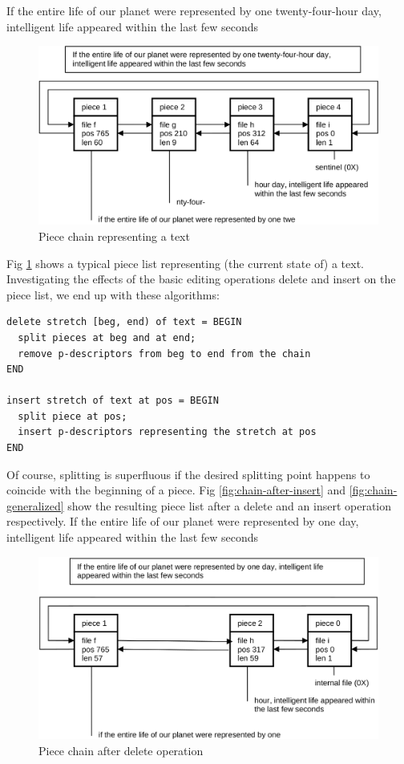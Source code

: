 If the entire life of our planet were represented by one twenty-four-hour day,
intelligent life appeared within the last few seconds
\begin{figure}
	\label{fig:chain}
	\centering
	\includegraphics[width=\textwidth]{i/d}
	\caption{Piece chain representing a text}
\end{figure}

Fig \ref{fig:chain} shows a typical piece list representing (the current state of) a text. Investigating the
effects of the basic editing operations delete and insert on the piece list, we end up with these
algorithms:
\begin{verbatim}
delete stretch [beg, end) of text = BEGIN
  split pieces at beg and at end;
  remove p-descriptors from beg to end from the chain
END

insert stretch of text at pos = BEGIN
  split piece at pos;
  insert p-descriptors representing the stretch at pos
END
\end{verbatim}
Of course, splitting is superfluous if the desired splitting point happens to coincide with the
beginning of a piece. Fig \ref{fig:chain-after-insert} and \ref{fig:chain-generalized} show the resulting piece list after a delete and an insert operation respectively.
If the entire life of our planet were represented by one day, intelligent life
appeared within the last few seconds
\begin{figure}
	\label{fig:chain-after-delete}
	\centering
	\includegraphics[width=\textwidth]{i/e}
	\caption{Piece chain after delete operation}
\end{figure}

